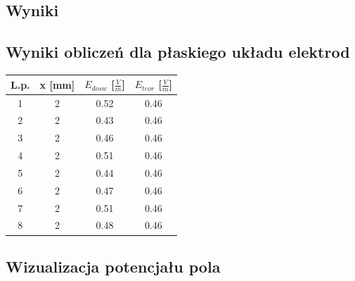 \documentclass[a4paper,12pt]{article}
\begin{document}
\begin{justify}
\section{Wyniki}

\subsection{Wyniki obliczeń dla płaskiego układu elektrod}

\begin{center}
\begin{tabular}{ |c|c|c|c| }
\hline
L.p. & x [mm] & $E_{dosw}$ [$\frac{V}{m}$] & $E_{teor}$ [$\frac{V}{m}$] \\
\hline
1 & 2 & 0.52 & 0.46 \\
\hline
2 & 2 & 0.43 & 0.46 \\
\hline
3 & 2 & 0.46 & 0.46 \\
\hline
4 & 2 & 0.51 & 0.46 \\
\hline
5 & 2 & 0.44 & 0.46 \\
\hline
6 & 2 & 0.47 & 0.46 \\
\hline
7 & 2 & 0.51 & 0.46 \\
\hline
8 & 2 & 0.48 & 0.46 \\
\hline
\end{tabular}
\end{center}

\subsection{Wizualizacja potencjału pola}


\end{justify}
\end{document}
